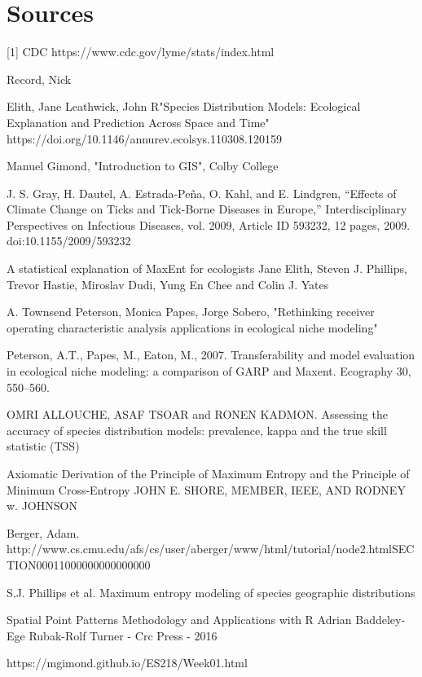 
\chapter{Sources} %
[1] CDC https://www.cdc.gov/lyme/stats/index.html \newline

\noindent [2] Record, Nick \newline

\noindent [3] Elith, Jane Leathwick, John R"Species Distribution Models: Ecological Explanation and Prediction Across Space and Time" https://doi.org/10.1146/annurev.ecolsys.110308.120159\newline

\noindent [4] Manuel Gimond, "Introduction to GIS", Colby College \newline

\noindent [5] J. S. Gray, H. Dautel, A. Estrada-Peña, O. Kahl, and E. Lindgren, “Effects of Climate Change on Ticks and Tick-Borne Diseases in Europe,” Interdisciplinary Perspectives on Infectious Diseases, vol. 2009, Article ID 593232, 12 pages, 2009. doi:10.1155/2009/593232\newline

\noindent [6] A statistical explanation of MaxEnt for ecologists Jane Elith, Steven J. Phillips, Trevor Hastie, Miroslav Dudi, Yung En Chee and Colin J. Yates\newline

\noindent [7] A. Townsend Peterson, Monica Papes, Jorge Sobero, "Rethinking receiver operating characteristic analysis applications in ecological niche modeling" \newline

\noindent [8] Peterson, A.T., Papes, M., Eaton, M., 2007. Transferability and model evaluation in ecological niche modeling: a comparison of GARP and Maxent. Ecography 30, 550–560. \newline

\noindent [9] OMRI ALLOUCHE, ASAF TSOAR and RONEN KADMON. Assessing the accuracy of species distribution models: prevalence, kappa and the true skill statistic (TSS) \newline

\noindent [10]  Axiomatic Derivation of the Principle of Maximum Entropy and the Principle of Minimum Cross-Entropy JOHN E. SHORE, MEMBER, IEEE, AND RODNEY w. JOHNSON \newline

\noindent [11] Berger, Adam. \newline http://www.cs.cmu.edu/afs/cs/user/aberger/www/html/tutorial/node2.htmlSECTION00011000000000000000 \newline

\noindent [12] S.J. Phillips et al. Maximum entropy modeling of species geographic distributions \newline

\noindent[13] Spatial Point Patterns Methodology and Applications with R
Adrian Baddeley-Ege Rubak-Rolf Turner - Crc Press - 2016 \newline

\noindent [14] https://mgimond.github.io/ES218/Week01.html